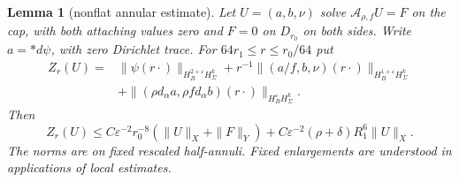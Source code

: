 \documentclass[11pt]{amsart}
\newtheorem{lemma}[theorem]{Lemma}
\theoremstyle{definition}
\theoremstyle{remark}
\theoremstyle{plain}
\begin{document}
\begin{lemma}[nonflat annular estimate]\label{lem:gluing-cap-annuli}
Let $U=(a,b,\nu)$ solve $\mathcal A_{\rho,f}U=F$ on the cap,
with both attaching values zero and $F=0$ on $D_{r_0}$ on both
sides. Write $a=*d\psi$, with zero Dirichlet trace. For
$64r_1\leq r\leq r_0/64$ put
\begin{equation}\label{eq:gluing-cap-annular-norm}
 \begin{split}
 Z_r(U)={}&\|\psi(r\cdot)\|_{H_B^{2+\varepsilon}H^k_\Sigma}
  +r^{-1}\|(a/f,b,\nu)(r\cdot)\|_{H_B^{1+\varepsilon}H^k_\Sigma}\\
 &+\|(\rho d_\alpha a,\rho f d_\alpha b)(r\cdot)
                                             \|_{H_B^\varepsilon H^k_\Sigma}.
 \end{split}
\end{equation}
Then
\begin{equation}\label{eq:gluing-cap-annular-bound}
 Z_r(U)\leq C\varepsilon^{-2}r_0^{-8}(\|U\|_X+\|F\|_Y)
          +C\varepsilon^{-2}(\rho+\delta)R_1^6\|U\|_X.
\end{equation}
The norms are on fixed rescaled half-annuli. Fixed enlargements
are understood in applications of local estimates.
\end{lemma}
\end{document}
